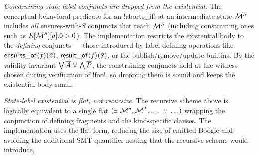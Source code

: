 \begin{Itemize}
    \item \emph{Constraining state-label conjuncts are dropped from the existential.}
    The conceptual behavioral predicate for an !aborts_if! at an intermediate state $\mathcal{M}^S$ includes \emph{all} ensures-with-$S$ conjuncts that reach $\mathcal{M}^S$ (including constraining ones such as $R[\mathcal{M}^S][a].0 > 0$).
    The implementation restricts the existential body to the \emph{defining} conjuncts --- those introduced by label-defining operations like $\mathop{\mathstrut{\mathsf{ensures\_of}}}\nolimits\langle f\rangle(\bar{x})$, $\mathop{\mathstrut{\mathsf{result\_of}}}\nolimits\langle f\rangle(\bar{x})$, or the publish/remove/update builtins.
    By the validity invariant $\bigvee \overline{A} \mathrel{\mathstrut{\vee}} \bigwedge \overline{P}$, the constraining conjuncts hold at the witness chosen during verification of !foo!, so dropping them is sound and keeps the existential body small.

    \item \emph{State-label existential is flat, not recursive.}
    The recursive scheme above is logically equivalent to a single flat $(\exists\, \Mem^S, \Mem^T, \ldots\; ::\;  \ldots)$ wrapping the conjunction of defining fragments and the kind-specific clauses.
    The implementation uses the flat form, reducing the size of emitted Boogie and avoiding the additional SMT quantifier nesting that the recursive scheme would introduce.
\end{Itemize}
